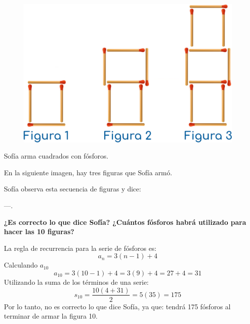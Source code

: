 \begin{figure}
    \centering
    \includegraphics[width=0.85\linewidth]{../images/cuadros_fosforos}
\end{figure}

Sofía arma cuadrados con fósforos. 

En la siguiente imagen, hay tres figuras que Sofía armó.

Sofía observa esta secuencia de figuras y dice:

\vspace{1.5em}
---.
\vspace{1.5em}

\textbf{¿Es correcto lo que dice Sofía? ¿Cuántos fósforos habrá utilizado para hacer las 10 figuras?}

\begin{solutionbox}{5.5cm}
    La regla de recurrencia para la serie de fósforos es:
    \[a_n=3(n-1)+4\]
    Calculando $a_{10}$
    \[a_{10}=3(10-1)+4= 3(9)+4 = 27 + 4 = 31     \]
    Utilizando la suma de los términos de una serie:
    \[s_{10}=\dfrac{10(4+31)}{2}=5 (35) =175\]
    Por lo tanto, no es correcto lo que dice Sofía, ya que: tendrá 175 fósforos al terminar de armar la figura 10.
\end{solutionbox}